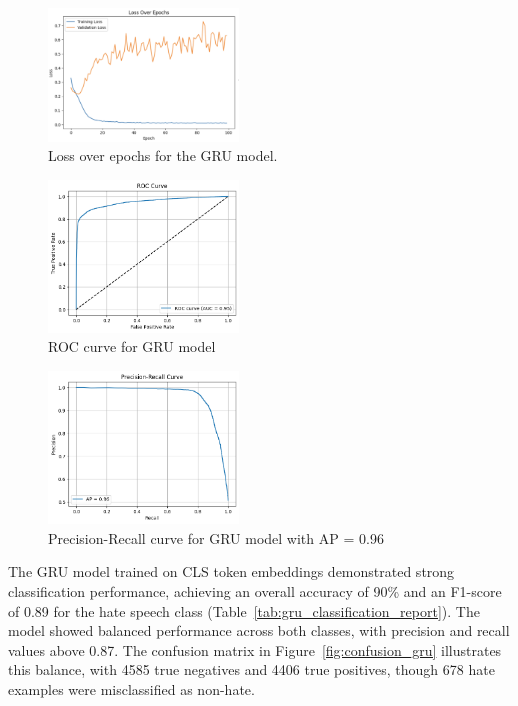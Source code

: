 \begin{figure}[H]
    \centering
    \includegraphics[width=0.45\textwidth]{images/lossOverEpochGRU.png}
    \caption{Loss over epochs for the GRU model.}
    \label{fig:loss_gru}
\end{figure}


\begin{figure}[H]
    \centering
    \includegraphics[width=0.45\textwidth]{images/roc_curve_gru.png}
    \caption{ROC curve for GRU model}
    \label{fig:roc_gru}
\end{figure}

\begin{figure}[H]
    \centering
    \includegraphics[width=0.45\textwidth]{images/precision_recall_gru.png}
    \caption{Precision-Recall curve for GRU model with AP = 0.96}
    \label{fig:pr_gru}
\end{figure}

The GRU model trained on CLS token embeddings demonstrated strong classification performance, achieving an overall accuracy of 90\% and an F1-score of 0.89 for the hate speech class (Table~\ref{tab:gru_classification_report}). The model showed balanced performance across both classes, with precision and recall values above 0.87. The confusion matrix in Figure~\ref{fig:confusion_gru} illustrates this balance, with 4585 true negatives and 4406 true positives, though 678 hate examples were misclassified as non-hate.

